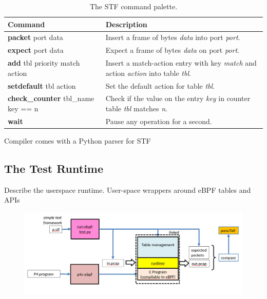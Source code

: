 \begin{table}[h]
	\begin{center}
		\begin{tabular}{|l|l|} \hline
			\textbf{Command} & \textbf{Description} \\ \hline \hline
			\textbf{packet} port data & Insert a frame of bytes 
			\textit{data} into port \textit{port}.    \\ \hline
			\textbf{expect} port data & Expect a frame of bytes 
			\textit{data} on port \textit{port}.  \\ \hline
			\textbf{add} tbl priority match action & Insert a 
			match-action entry with key \textit{match} and action 
			\textit{action} into table \textit{tbl}. \\ \hline
			\textbf{setdefault} tbl action & Set the default action for table 
			\textit{tbl}. \\ 
			\hline
			\textbf{check\_counter} tbl\_name key == n & Check if the value on 
			the entry \textit{key} in counter table \textit{tbl} matches 
			\textit{n}.  \\ 
			\hline
			\textbf{wait} & Pause any operation for a second. \\ \hline
		\end{tabular}
		\caption{The STF command palette.}\label{table:stf}
	\end{center}
\end{table}


Compiler comes with a Python parser for STF

\subsection{The Test Runtime}
Describe the userspace runtime.
User-space wrappers around eBPF tables and APIs
\begin{figure}
	\centering
	\includegraphics[width=0.7\linewidth]{user_test}
	\caption{}
	\label{fig:user_test}
\end{figure}


